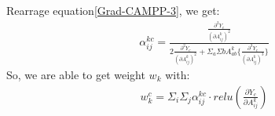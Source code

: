\documentclass[conference]{IEEEtran}
\begin{document}
Rearrage equation\ref{Grad-CAMPP-3}, we get:
    \begin{equation}
        \begin{aligned}
\alpha_{ij}^{kc}=\frac{\frac{\partial^{2} Y_{c}}{(\partial A_{ij}^{k})^{2}}}{2\frac{\partial^{2} Y_{c}}{(\partial A_{ij}^{k})^{2}}+\Sigma_{a}\Sigma{b}A_{ab}^{k}\{\frac{\partial^{3} Y_{c}}{(\partial A_{ij}^{k})^{3}}\}}
            \label{Grad-CAMPP-4}
        \end{aligned}
        \end{equation}
So, we are able to get weight $w_{k}$ with:
\begin{equation}
    \begin{aligned}
        w_{k}^{c}=\Sigma_{i}\Sigma_{j}\alpha_{ij}^{kc}·relu(\frac{\partial Y_{c}}{\partial A_{ij}^{k}})
        \label{Grad-CAMPP-5}
    \end{aligned}
    \end{equation}
\end{document}
